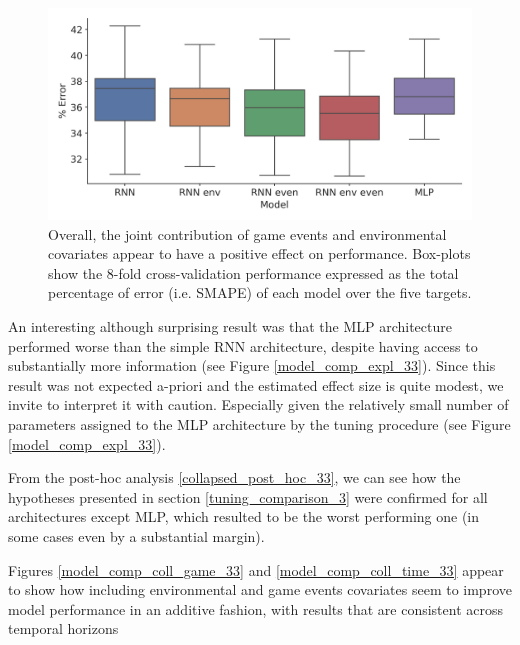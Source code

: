 \begin{figure}[h]
\centering
\includegraphics[width=.7\columnwidth]{images/chapter_3/performance_collapsed_33.png}
\caption[\textbf{Aggregated comparison of model performance}]{ Overall, the joint contribution of game events and environmental covariates appear to have a positive effect on performance. Box-plots show the 8-fold cross-validation performance expressed as the total percentage of error (i.e. SMAPE) of each model over the five targets.}
\label{model_comp_coll_33} 
\end{figure}

An interesting although surprising result was that the MLP architecture performed worse than the simple RNN architecture, despite having access to substantially more information (see Figure \ref{model_comp_expl_33}). Since this result was not expected a-priori and the estimated effect size is quite modest, we invite to interpret it with caution. Especially given the relatively small number of parameters assigned to the MLP architecture by the tuning procedure (see Figure \ref{model_comp_expl_33}).



From the post-hoc analysis \ref{collapsed_post_hoc_33}, we can see how the hypotheses presented in section \ref{tuning_comparison_3} were confirmed for all architectures except MLP, which resulted to be the worst performing one (in some cases even by a substantial margin).



Figures \ref{model_comp_coll_game_33} and \ref{model_comp_coll_time_33} appear to show how including environmental and game events covariates seem to improve model performance in an additive fashion, with results that are consistent across temporal horizons

